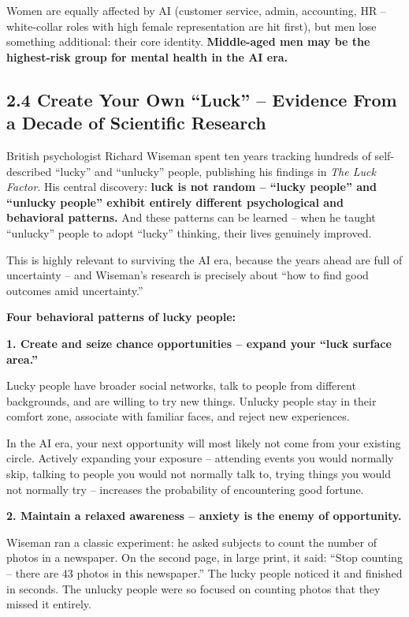 Women are equally affected by AI (customer service, admin, accounting,
HR -- white-collar roles with high female representation are hit first),
but men lose something additional: their core identity.
\textbf{Middle-aged men may be the highest-risk group for mental health
in the AI era.}

\subsection{2.4 Create Your Own ``Luck'' -- Evidence From a Decade of
Scientific
Research}\label{create-your-own-luck-evidence-from-a-decade-of-scientific-research}

British psychologist Richard Wiseman spent ten years tracking hundreds
of self-described ``lucky'' and ``unlucky'' people, publishing his
findings in \emph{The Luck Factor}. His central discovery: \textbf{luck
is not random -- ``lucky people'' and ``unlucky people'' exhibit
entirely different psychological and behavioral patterns.} And these
patterns can be learned -- when he taught ``unlucky'' people to adopt
``lucky'' thinking, their lives genuinely improved.

This is highly relevant to surviving the AI era, because the years ahead
are full of uncertainty -- and Wiseman's research is precisely about
``how to find good outcomes amid uncertainty.''

\textbf{Four behavioral patterns of lucky people:}

\textbf{1. Create and seize chance opportunities -- expand your ``luck
surface area.''}

Lucky people have broader social networks, talk to people from different
backgrounds, and are willing to try new things. Unlucky people stay in
their comfort zone, associate with familiar faces, and reject new
experiences.

In the AI era, your next opportunity will most likely not come from your
existing circle. Actively expanding your exposure -- attending events
you would normally skip, talking to people you would not normally talk
to, trying things you would not normally try -- increases the
probability of encountering good fortune.

\textbf{2. Maintain a relaxed awareness -- anxiety is the enemy of
opportunity.}

Wiseman ran a classic experiment: he asked subjects to count the number
of photos in a newspaper. On the second page, in large print, it said:
``Stop counting -- there are 43 photos in this newspaper.'' The lucky
people noticed it and finished in seconds. The unlucky people were so
focused on counting photos that they missed it entirely.

